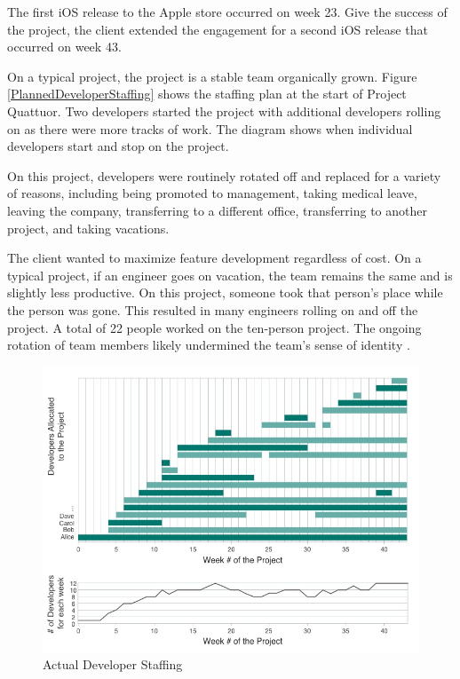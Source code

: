 The first iOS release to the Apple store occurred on week 23. Give the success of the project, the client extended the engagement for a second iOS release that occurred on week 43. 

On a typical project, the project is a stable team organically grown. Figure \ref{PlannedDeveloperStaffing} shows the staffing plan at the start of Project Quattuor. Two developers started the project with additional developers rolling on as there were more tracks of work. The diagram shows when individual developers start and stop on the project. 

On this project, developers were routinely rotated off and replaced for a variety of reasons, including being promoted to management, taking medical leave, leaving the company, transferring to a different office, transferring to another project, and taking vacations. 

The client wanted to maximize feature development regardless of cost. On a typical project, if an engineer goes on vacation, the team remains the same and is slightly less productive. On this project, someone took that person's place while the person was gone. This resulted in many engineers rolling on and off the project. A total of 22 people worked on the ten-person project. The ongoing rotation of team members likely undermined the team's sense of identity \cite{TuckmanModel}.

\begin{figure}[t]
\centering
\includegraphics[width=7.1in]{DeveloperStaffing.jpg}
\caption{Actual Developer Staffing}
\label{DeveloperStaffing}
\end{figure}

